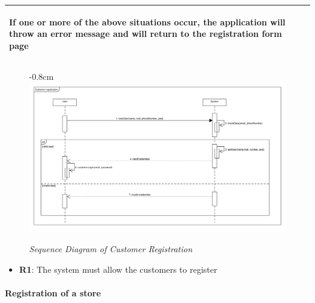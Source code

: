\documentclass{article}
\begin{document}
\begin{center}
\begin{adjustwidth}{-3cm}{}
\begin{tabular}[h!]{|m{7.5em}|m{36em}|}
\begin{enumerate}
						\end{enumerate}
						If one or more of the above situations occur, the application will throw an error message and will return to the registration form page\\		
						\hline
						
					\end{tabular}

					
					

					\begin{figure}[!h]
						\begin{adjustwidth} {-0.8cm}{}
							\includegraphics[scale=0.36]{SD/1_customerRegistration.pdf}
						\end{adjustwidth}
						\caption{\emph{Sequence Diagram of Customer Registration}}
					\end{figure}
					\end{adjustwidth}
				
					\begin{itemize}
					\medskip
					{\bfseries Required functional requirements: }
					\item {\bfseries R1}: The system must allow the customers to register


					\end{itemize}
				\end{center}
			\bigskip
			\paragraph{Registration of a store}
			
\end{document}
